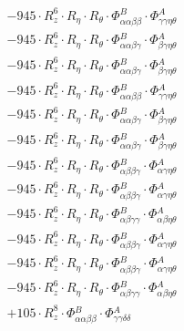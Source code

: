 \documentclass{article}
\begin{document}
\begin{subequations}
\begin{gather}
\begin{array}{c}
 \\[0.2em] 		 - 945 \cdot R_{z}^{6} \cdot R_{\eta{}} \cdot R_{\theta{}} \cdot \Phi{}^{B}_{\alpha{}\alpha{}\beta{}\beta{}} \cdot \Phi{}^{A}_{\gamma{}\gamma{}\eta{}\theta{}} 
 \\[0.2em] 		 - 945 \cdot R_{z}^{6} \cdot R_{\eta{}} \cdot R_{\theta{}} \cdot \Phi{}^{B}_{\alpha{}\alpha{}\beta{}\gamma{}} \cdot \Phi{}^{A}_{\beta{}\gamma{}\eta{}\theta{}} 
 \\[0.2em] 		 - 945 \cdot R_{z}^{6} \cdot R_{\eta{}} \cdot R_{\theta{}} \cdot \Phi{}^{B}_{\alpha{}\alpha{}\beta{}\gamma{}} \cdot \Phi{}^{A}_{\beta{}\gamma{}\eta{}\theta{}} 
 \\[0.2em] 		 - 945 \cdot R_{z}^{6} \cdot R_{\eta{}} \cdot R_{\theta{}} \cdot \Phi{}^{B}_{\alpha{}\alpha{}\beta{}\beta{}} \cdot \Phi{}^{A}_{\gamma{}\gamma{}\eta{}\theta{}} 
 \\[0.2em] 		 - 945 \cdot R_{z}^{6} \cdot R_{\eta{}} \cdot R_{\theta{}} \cdot \Phi{}^{B}_{\alpha{}\alpha{}\beta{}\gamma{}} \cdot \Phi{}^{A}_{\beta{}\gamma{}\eta{}\theta{}} 
 \\[0.2em] 		 - 945 \cdot R_{z}^{6} \cdot R_{\eta{}} \cdot R_{\theta{}} \cdot \Phi{}^{B}_{\alpha{}\alpha{}\beta{}\gamma{}} \cdot \Phi{}^{A}_{\beta{}\gamma{}\eta{}\theta{}} 
 \\[0.2em] 		 - 945 \cdot R_{z}^{6} \cdot R_{\eta{}} \cdot R_{\theta{}} \cdot \Phi{}^{B}_{\alpha{}\beta{}\beta{}\gamma{}} \cdot \Phi{}^{A}_{\alpha{}\gamma{}\eta{}\theta{}} 
 \\[0.2em] 		 - 945 \cdot R_{z}^{6} \cdot R_{\eta{}} \cdot R_{\theta{}} \cdot \Phi{}^{B}_{\alpha{}\beta{}\beta{}\gamma{}} \cdot \Phi{}^{A}_{\alpha{}\gamma{}\eta{}\theta{}} 
 \\[0.2em] 		 - 945 \cdot R_{z}^{6} \cdot R_{\eta{}} \cdot R_{\theta{}} \cdot \Phi{}^{B}_{\alpha{}\beta{}\gamma{}\gamma{}} \cdot \Phi{}^{A}_{\alpha{}\beta{}\eta{}\theta{}} 
 \\[0.2em] 		 - 945 \cdot R_{z}^{6} \cdot R_{\eta{}} \cdot R_{\theta{}} \cdot \Phi{}^{B}_{\alpha{}\beta{}\beta{}\gamma{}} \cdot \Phi{}^{A}_{\alpha{}\gamma{}\eta{}\theta{}} 
 \\[0.2em] 		 - 945 \cdot R_{z}^{6} \cdot R_{\eta{}} \cdot R_{\theta{}} \cdot \Phi{}^{B}_{\alpha{}\beta{}\beta{}\gamma{}} \cdot \Phi{}^{A}_{\alpha{}\gamma{}\eta{}\theta{}} 
 \\[0.2em] 		 - 945 \cdot R_{z}^{6} \cdot R_{\eta{}} \cdot R_{\theta{}} \cdot \Phi{}^{B}_{\alpha{}\beta{}\gamma{}\gamma{}} \cdot \Phi{}^{A}_{\alpha{}\beta{}\eta{}\theta{}} 
 \\[0.2em] 		 + 105 \cdot R_{z}^{8} \cdot \Phi{}^{B}_{\alpha{}\alpha{}\beta{}\beta{}} \cdot \Phi{}^{A}_{\gamma{}\gamma{}\delta{}\delta{}} 

\end{array}
\end{gather}
\end{subequations}
\end{document}
